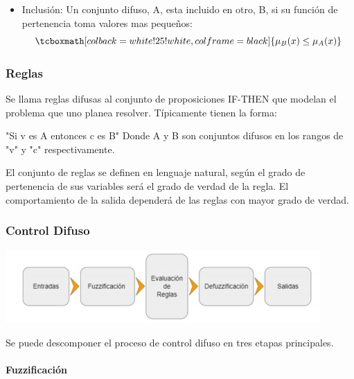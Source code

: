 \begin{itemize}
    \item Inclusión:  \hfill  
    Un conjunto difuso, A, esta incluido en otro, B, si su función de pertenencia toma valores mas pequeños: 
    \begin{equation}
    \tcboxmath[colback=white!25!white,colframe=black]
    {\mu_B (x) \leq \mu_A (x)}  
    \end{equation}
    
\end{itemize}


\subsubsection{Reglas}

Se llama reglas difusas al conjunto de proposiciones IF-THEN que modelan el problema que uno planea resolver. Típicamente tienen la forma: \par
\bigbreak
    "Si v es A entonces c es B"
\bigbreak
Donde A y B son conjuntos difusos en los rangos de "v" y "c" respectivamente.
\bigbreak

El conjunto de reglas se definen en lenguaje natural, según el grado de pertenencia de sus variables será el grado de verdad de la regla. El comportamiento de la salida dependerá de las reglas con mayor grado de verdad.\par

\subsubsection{Control Difuso}

\begin{center}
    \includegraphics[scale=0.7]{Tesis/Capitulos/02_MARCO_TEORICO/img/etapas.png}
\end{center}

Se puede descomponer el proceso de control difuso en tres etapas principales.\par

\paragraph{Fuzzificación} 

